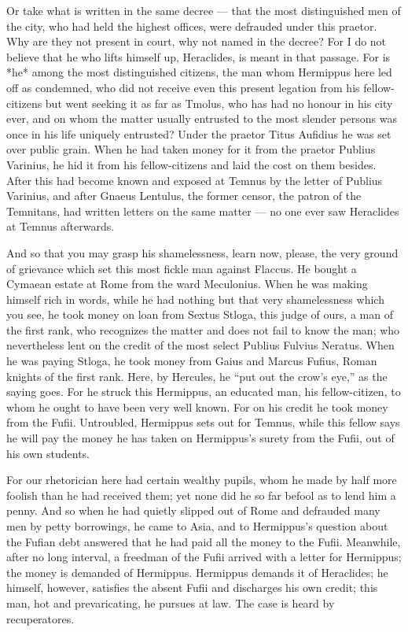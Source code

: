  Or take what is written in the same decree --- that the most distinguished men of the city, who had held the highest offices, were defrauded under this praetor. Why are they not present in court, why not named in the decree? For I do not believe that he who lifts himself up, Heraclides, is meant in that passage. For is *he* among the most distinguished citizens, the man whom Hermippus here led off as condemned, who did not receive even this present legation from his fellow-citizens but went seeking it as far as Tmolus, who has had no honour in his city ever, and on whom the matter usually entrusted to the most slender persons was once in his life uniquely entrusted? Under the praetor Titus Aufidius he was set over public grain. When he had taken money for it from the praetor Publius Varinius, he hid it from his fellow-citizens and laid the cost on them besides. After this had become known and exposed at Temnus by the letter of Publius Varinius, and after Gnaeus Lentulus, the former censor, the patron of the Temnitans, had written letters on the same matter --- no one ever saw Heraclides at Temnus afterwards.

 And so that you may grasp his shamelessness, learn now, please, the very ground of grievance which set this most fickle man against Flaccus. He bought a Cymaean estate at Rome from the ward Meculonius. When he was making himself rich in words, while he had nothing but that very shamelessness which you see, he took money on loan from Sextus Stloga, this judge of ours, a man of the first rank, who recognizes the matter and does not fail to know the man; who nevertheless lent on the credit of the most select Publius Fulvius Neratus. When he was paying Stloga, he took money from Gaius and Marcus Fufius, Roman knights of the first rank. Here, by Hercules, he ``put out the crow's eye,'' as the saying goes. For he struck this Hermippus, an educated man, his fellow-citizen, to whom he ought to have been very well known. For on his credit he took money from the Fufii. Untroubled, Hermippus sets out for Temnus, while this fellow says he will pay the money he has taken on Hermippus's surety from the Fufii, out of his own students.

 For our rhetorician here had certain wealthy pupils, whom he made by half more foolish than he had received them; yet none did he so far befool as to lend him a penny. And so when he had quietly slipped out of Rome and defrauded many men by petty borrowings, he came to Asia, and to Hermippus's question about the Fufian debt answered that he had paid all the money to the Fufii. Meanwhile, after no long interval, a freedman of the Fufii arrived with a letter for Hermippus; the money is demanded of Hermippus. Hermippus demands it of Heraclides; he himself, however, satisfies the absent Fufii and discharges his own credit; this man, hot and prevaricating, he pursues at law. The case is heard by recuperatores.

